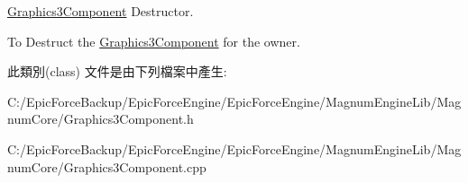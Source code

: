 \hyperlink{class_magnum_1_1_graphics3_component}{Graphics3\+Component} Destructor. 

To Destruct the \hyperlink{class_magnum_1_1_graphics3_component}{Graphics3\+Component} for the owner. 

此類別(class) 文件是由下列檔案中產生\+:\begin{DoxyCompactItemize}
\item 
C\+:/\+Epic\+Force\+Backup/\+Epic\+Force\+Engine/\+Epic\+Force\+Engine/\+Magnum\+Engine\+Lib/\+Magnum\+Core/Graphics3\+Component.\+h\item 
C\+:/\+Epic\+Force\+Backup/\+Epic\+Force\+Engine/\+Epic\+Force\+Engine/\+Magnum\+Engine\+Lib/\+Magnum\+Core/Graphics3\+Component.\+cpp\end{DoxyCompactItemize}
